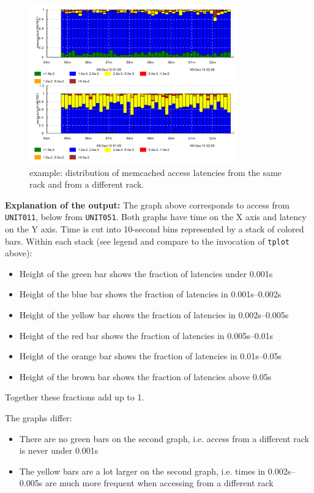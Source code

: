 \documentclass{article}
\begin{document}
\begin{figure}[h]
\center
\includegraphics[width=0.8\textwidth]{pics/tplot/tplot-motivating-example.png}
\caption{\timeplot{} example: distribution of memcached access latencies from the same rack and from a different rack.}
\label{fig:tplot-motivating-example}
\end{figure}

\textbf{Explanation of the output:} The graph above corresponds to access from \verb|UNIT011|, below from \verb|UNIT051|. Both graphs have time on the X axis and latency on the Y axis. Time is cut into 10-second bins represented by a stack of colored bars. Within each stack (see legend and compare to the invocation of \verb|tplot| above):
\begin{itemize}
\item Height of the green bar shows the fraction of latencies under 0.001s
\item Height of the blue bar shows the fraction of latencies in 0.001s--0.002s
\item Height of the yellow bar shows the fraction of latencies in 0.002s--0.005s
\item Height of the red bar shows the fraction of latencies in 0.005s--0.01s
\item Height of the orange bar shows the fraction of latencies in 0.01s--0.05s
\item Height of the brown bar shows the fraction of latencies above 0.05s
\end{itemize}

Together these fractions add up to 1.

The graphs differ:
\begin{itemize}
\item There are no green bars on the second graph, i.e. access from a different rack is never under 0.001s
\item The yellow bars are a lot larger on the second graph, i.e. times in 0.002s--0.005s are much more frequent when accessing from a different rack
\end{itemize}
\end{document}
